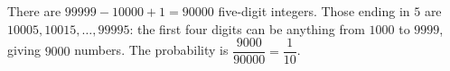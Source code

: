 There are $99999-10000+1=90000$ five-digit integers. Those ending in $5$ are $10005,10015,\dots,99995$: the first four digits can be anything from $1000$ to $9999$, giving $9000$ numbers. The probability is $\dfrac{9000}{90000}=\boxed{\dfrac{1}{10}}$.
